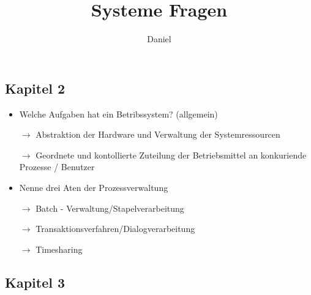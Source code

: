 \documentclass[10pt,a4paper]{article}
\author{Daniel}
\title{Systeme Fragen}
\begin{document}
\maketitle

\subsection*{Kapitel 2}

\begin{itemize}
\item  Welche Aufgaben hat ein Betribssystem? (allgemein)
\item[$\rightarrow$] Abstraktion der Hardware und Verwaltung der Systemressourcen
\item[$\rightarrow$] Geordnete und kontollierte Zuteilung der Betriebsmittel an konkuriende Prozesse / Benutzer
\item Nenne drei Aten der Prozessverwaltung
\item[$\rightarrow$] Batch - Verwaltung/Stapelverarbeitung
\item[$\rightarrow$] Transaktionsverfahren/Dialogverarbeitung
\item[$\rightarrow$] Timesharing
\end{itemize}

\subsection*{Kapitel 3}
\end{document}
